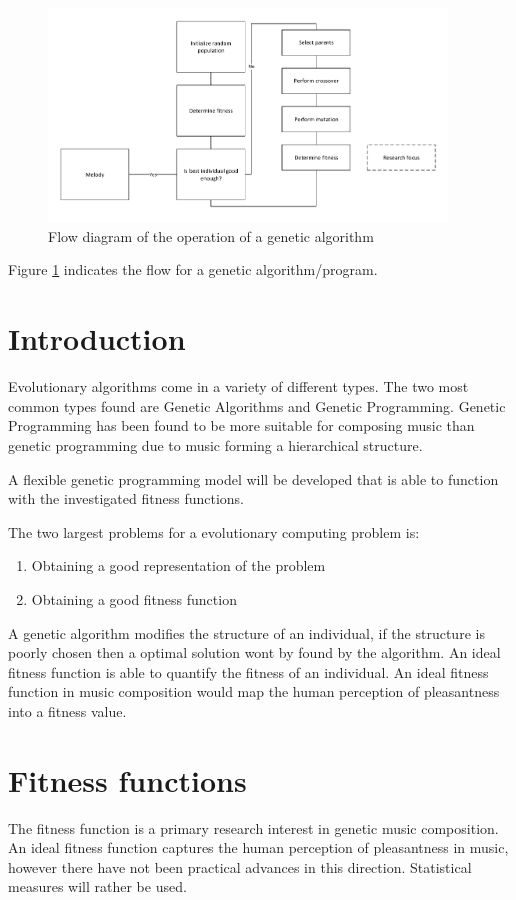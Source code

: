 \begin{figure}
\centerline{\includegraphics[width=400px]{../images/GA_flow.pdf}}
\caption{Flow diagram of the operation of a genetic algorithm}
\label{ims:geneticflow}
\end{figure}

Figure \ref{ims:geneticflow} indicates the flow for a genetic algorithm/program.

\section{Introduction}

Evolutionary algorithms come in a variety of different types. The two most common types found are Genetic Algorithms and Genetic Programming. Genetic Programming has been found to be more suitable for composing music than genetic programming due to music forming a hierarchical structure.

A flexible genetic programming model will be developed that is able to function with the investigated fitness functions. 

The two largest problems for a evolutionary computing problem is:
\begin{enumerate}
\item Obtaining a good representation of the problem
\item Obtaining a good fitness function
\end{enumerate}
A genetic algorithm modifies the structure of an individual, if the structure is poorly chosen then a optimal solution wont by found by the algorithm.
An ideal fitness function is able to quantify the fitness of an individual. An ideal fitness function in music composition would map the human perception of pleasantness into a fitness value. 

\section{Fitness functions}
The fitness function is a primary research interest in genetic music composition. 
An ideal fitness function captures the human perception of pleasantness in music, however there have not been practical advances in this direction. Statistical measures will rather be used.

